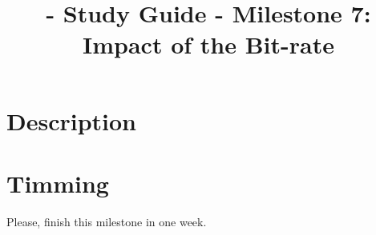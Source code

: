 
\title{\TM{} - Study Guide - Milestone 7: Impact of the Bit-rate}

\maketitle

\section{Description}


\section{Timming}

Please, finish this milestone in one week.


